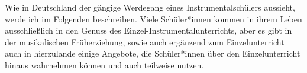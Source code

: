 
Wie in Deutschland der gängige Werdegang eines Instrumentalschülers aussieht,
werde ich im Folgenden beschreiben. Viele Schüler*innen kommen in ihrem Leben
ausschließlich in den Genuss des Einzel-Instrumentalunterrichts, aber es gibt in
der musikalischen Früherziehung, sowie auch ergänzend zum Einzelunterricht auch
in hierzulande einige Angebote, die Schüler*innen über den Einzelunterricht hinaus
wahrnehmen können und auch teilweise nutzen.





